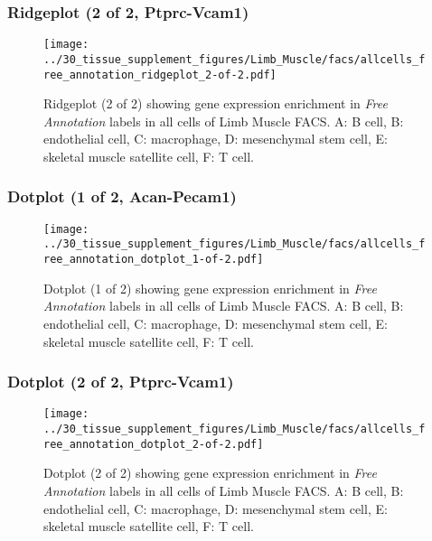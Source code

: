 \clearpage

\subsubsection{Ridgeplot (2 of 2, Ptprc-Vcam1)}
\begin{figure}[h]
\centering
\texttt{[image: ../30\_tissue\_supplement\_figures/Limb\_Muscle/facs/allcells\_free\_annotation\_ridgeplot\_2-of-2.pdf]}

\caption{ Ridgeplot (2 of 2)  showing gene expression enrichment in \emph{Free Annotation} labels in all cells of Limb Muscle FACS. A: B cell, B: endothelial cell, C: macrophage, D: mesenchymal stem cell, E: skeletal muscle satellite cell, F: T cell.}
\end{figure}


\clearpage

\subsubsection{Dotplot (1 of 2, Acan-Pecam1)}
\begin{figure}[h]
\centering
\texttt{[image: ../30\_tissue\_supplement\_figures/Limb\_Muscle/facs/allcells\_free\_annotation\_dotplot\_1-of-2.pdf]}

\caption{ Dotplot (1 of 2)  showing gene expression enrichment in \emph{Free Annotation} labels in all cells of Limb Muscle FACS. A: B cell, B: endothelial cell, C: macrophage, D: mesenchymal stem cell, E: skeletal muscle satellite cell, F: T cell.}
\end{figure}


\clearpage

\subsubsection{Dotplot (2 of 2, Ptprc-Vcam1)}
\begin{figure}[h]
\centering
\texttt{[image: ../30\_tissue\_supplement\_figures/Limb\_Muscle/facs/allcells\_free\_annotation\_dotplot\_2-of-2.pdf]}

\caption{ Dotplot (2 of 2)  showing gene expression enrichment in \emph{Free Annotation} labels in all cells of Limb Muscle FACS. A: B cell, B: endothelial cell, C: macrophage, D: mesenchymal stem cell, E: skeletal muscle satellite cell, F: T cell.}
\end{figure}

